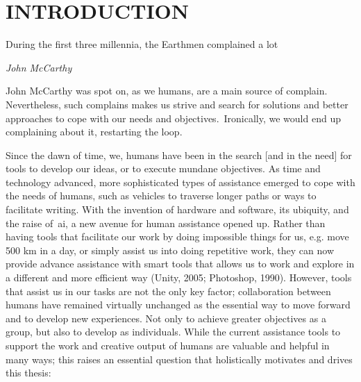 \section{INTRODUCTION} \normalfont 
\label{sec:intro}

\epigraph{During the first three millennia, the Earthmen complained a lot}{\textit{John McCarthy}}


John McCarthy was spot on, as we humans, are a main source of complain. Nevertheless, such complains makes us strive and search for solutions and better approaches to cope with our needs and objectives.\ Ironically, we would end up complaining about it, restarting the loop.

Since the dawn of time, we, humans have been in the search [and in the need] for tools to develop our ideas, or to execute mundane objectives. As time and technology advanced, more sophisticated types of assistance emerged to cope with the needs of humans, such as vehicles to traverse longer paths or ways to facilitate writing. With the invention of hardware and software, its ubiquity, and the raise of~\acrfull{ai}, a new avenue for human assistance opened up. Rather than having tools that facilitate our work by doing impossible things for us, e.g. move 500 km in a day, or simply assist us into doing repetitive work, they can now provide advance assistance with smart tools that allows us to work and explore in a different and more efficient way (Unity, 2005; Photoshop, 1990). However, tools that assist us in our tasks are not the only key factor; collaboration between humans have remained virtually unchanged as the essential way to move forward and to develop new experiences. Not only to achieve greater objectives as a group, but also to develop as individuals. While the current assistance tools to support the work and creative output of humans are valuable and helpful in many ways; this raises an essential question that holistically motivates and drives this thesis:

